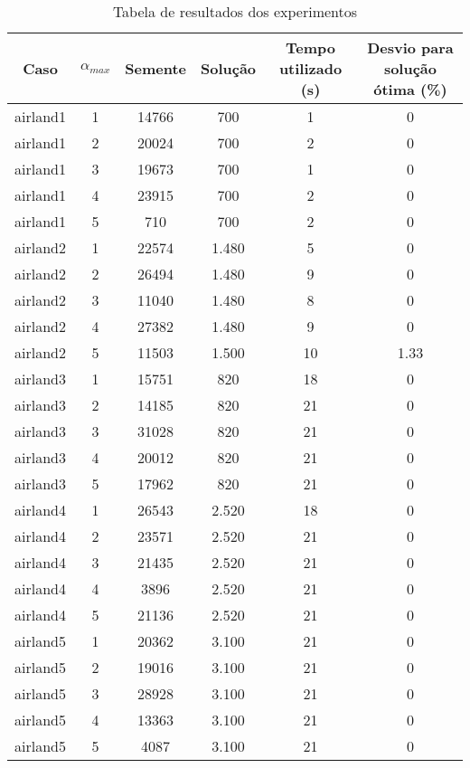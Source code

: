\documentclass[a4paper,10pt]{abnt} %
\begin{document}
\begin{table}

\centering

\caption{Tabela de resultados dos experimentos}

\begin{tabular}{|c|c|c|c|c|c|}

\hline %

Caso & $\alpha_{max}$ & Semente & Solução & Tempo utilizado (s) & Desvio para solução ótima (\%)  \\

\hline
airland1 & 1 & 14766 & 700 & 1 & 0 \\ 
airland1 & 2 & 20024 & 700 & 2 & 0 \\ 
airland1 & 3 & 19673 & 700 & 1 & 0 \\ 
airland1 & 4 & 23915 & 700 & 2 & 0 \\ 
airland1 & 5 & 710 & 700 & 2 & 0 \\ 
\hline
airland2 & 1 & 22574 & 1.480 & 5 & 0 \\ 
airland2 & 2 & 26494 & 1.480 & 9 & 0 \\ 
airland2 & 3 & 11040 & 1.480 & 8 & 0 \\ 
airland2 & 4 & 27382 & 1.480 & 9 & 0 \\ 
airland2 & 5 & 11503 & 1.500 & 10 & 1.33 \\ 
\hline
airland3 & 1 & 15751 & 820 & 18 & 0 \\ 
airland3 & 2 & 14185 & 820 & 21 & 0 \\ 
airland3 & 3 & 31028 & 820 & 21 & 0 \\ 
airland3 & 4 & 20012 & 820 & 21 & 0 \\ 
airland3 & 5 & 17962 & 820 & 21 & 0 \\ 
\hline
airland4 & 1 & 26543 & 2.520 & 18 & 0 \\ 
airland4 & 2 & 23571 & 2.520 & 21 & 0 \\ 
airland4 & 3 & 21435 & 2.520 & 21 & 0 \\ 
airland4 & 4 & 3896 & 2.520 & 21 & 0 \\ 
airland4 & 5 & 21136 & 2.520 & 21 & 0 \\ 
\hline
airland5 & 1 & 20362 & 3.100 & 21 & 0 \\ 
airland5 & 2 & 19016 & 3.100 & 21 & 0 \\ 
airland5 & 3 & 28928 & 3.100 & 21 & 0 \\ 
airland5 & 4 & 13363 & 3.100 & 21 & 0 \\ 
airland5 & 5 & 4087 & 3.100 & 21 & 0 \\ 

\end{tabular}
\end{table}
\end{document}
